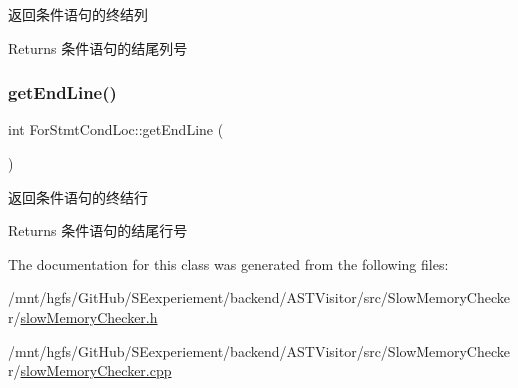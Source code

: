 返回条件语句的终结列

\begin{DoxyReturn}{Returns}
条件语句的结尾列号 
\end{DoxyReturn}
\mbox{\label{classForStmtCondLoc_aa3dc75623c0ccbc94fbd42ec784eeba1}} 
\subsubsection{\texorpdfstring{get\+End\+Line()}{getEndLine()}}
{\footnotesize\ttfamily int For\+Stmt\+Cond\+Loc\+::get\+End\+Line (\begin{DoxyParamCaption}{ }\end{DoxyParamCaption})}

返回条件语句的终结行

\begin{DoxyReturn}{Returns}
条件语句的结尾行号 
\end{DoxyReturn}


The documentation for this class was generated from the following files\+:\begin{DoxyCompactItemize}
\item 
/mnt/hgfs/\+Git\+Hub/\+S\+Eexperiement/backend/\+A\+S\+T\+Visitor/src/\+Slow\+Memory\+Checker/\hyperlink{slowMemoryChecker_8h}{slow\+Memory\+Checker.\+h}\item 
/mnt/hgfs/\+Git\+Hub/\+S\+Eexperiement/backend/\+A\+S\+T\+Visitor/src/\+Slow\+Memory\+Checker/\hyperlink{slowMemoryChecker_8cpp}{slow\+Memory\+Checker.\+cpp}\end{DoxyCompactItemize}
